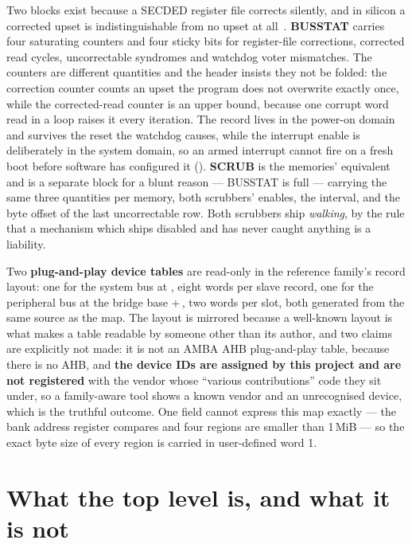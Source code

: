 Two blocks exist because a SECDED register file corrects silently, and in
silicon a corrected upset is indistinguishable from no upset at
all~\cite{santos2023}. \textbf{BUSSTAT} carries four saturating counters and four
sticky bits for register-file corrections, corrected read cycles,
uncorrectable syndromes and watchdog voter mismatches. The counters are different quantities and the header insists they not be
folded: the correction counter counts an upset the program does not
overwrite exactly once, while the corrected-read counter is an upper
bound, because one corrupt word read in a loop raises it every
iteration. The
record lives in the power-on domain and survives the reset the watchdog
causes, while the interrupt enable is deliberately in the system domain,
so an armed interrupt cannot fire on a fresh boot before software has
configured it (). \textbf{SCRUB} is the memories' equivalent and is a separate block for a
blunt reason --- BUSSTAT is full --- carrying the same three quantities
per memory, both scrubbers' enables, the interval, and the byte offset of
the last uncorrectable row. Both scrubbers ship \emph{walking}, by the
rule that a mechanism which ships disabled and has never caught anything
is a liability.

Two \textbf{plug-and-play device tables} are read-only in the reference
family's record layout: one for the system bus at ,
eight words per slave record, one for the peripheral bus at the bridge
base $+\,$, two words per slot, both generated from the
same source as the map. The layout is mirrored because a well-known
layout is what makes a table readable by someone other than its author,
and two claims are explicitly not made: it is not an AMBA AHB
plug-and-play table, because there is no AHB, and \textbf{the device IDs
are assigned by this project and are not registered} with the vendor
whose ``various contributions'' code they sit under, so a family-aware tool shows a known vendor and an unrecognised device,
which is the truthful outcome. One field cannot express this map exactly --- the bank address register
compares  and four regions are smaller than 1\,MiB ---
so the exact byte size of every region is carried in user-defined word 1.

\section{What the top level is, and what it is not}

